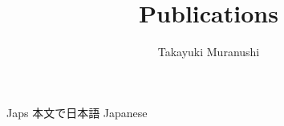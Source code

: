 \documentclass[utf8]{article}
\title{Publications}
\author{Takayuki Muranushi}
\begin{document}
\begin{CJK}{UTF8}{min}

\maketitle

\begin{bibunit}[custom2]
  \nocite{*}

  Japs 本文で日本語 Japanese

  \renewcommand\refname{Books}
  \putbib[books]
\end{bibunit}


\begin{bibunit}[custom2]
  \nocite{*}

  \renewcommand\refname{Peer-reviewed Publications}
  \putbib[publications]
\end{bibunit}

\end{CJK}
\end{document}
